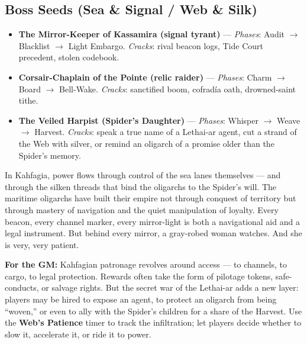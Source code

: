 \subsection*{Boss Seeds (Sea \& Signal / Web \& Silk)}
\begin{itemize}
\item \textbf{The Mirror-Keeper of Kassamira (signal tyrant)} --- \emph{Phases}: Audit $\rightarrow$ Blacklist $\rightarrow$ Light Embargo. \emph{Cracks}: rival beacon logs, Tide Court precedent, stolen codebook.
\item \textbf{Corsair-Chaplain of the Pointe (relic raider)} --- \emph{Phases}: Charm $\rightarrow$ Board $\rightarrow$ Bell-Wake. \emph{Cracks}: sanctified boom, cofradía oath, drowned-saint tithe.
\item \textbf{The Veiled Harpist (Spider's Daughter)} --- \emph{Phases}: Whisper $\rightarrow$ Weave $\rightarrow$ Harvest. \emph{Cracks}: speak a true name of a Lethai-ar agent, cut a strand of the Web with silver, or remind an oligarch of a promise older than the Spider's memory.
\end{itemize}

\begin{tcolorbox}[colback=black!3,colframe=black!40!white,title={Patronage \& Power},breakable]
In Kahfagia, power flows through control of the sea lanes themselves --- and through the silken threads that bind the oligarchs to the Spider's will. The maritime oligarchs have built their empire not through conquest of territory but through mastery of navigation and the quiet manipulation of loyalty. Every beacon, every channel marker, every mirror-light is both a navigational aid and a legal instrument. But behind every mirror, a gray-robed woman watches. And she is very, very patient.

\textbf{For the GM:}  
Kahfagian patronage revolves around access --- to channels, to cargo, to legal protection. Rewards often take the form of pilotage tokens, safe-conducts, or salvage rights. But the secret war of the Lethai-ar adds a new layer: players may be hired to expose an agent, to protect an oligarch from being ``woven,'' or even to ally with the Spider's children for a share of the Harvest. Use the \textbf{Web's Patience} timer to track the infiltration; let players decide whether to slow it, accelerate it, or ride it to power.
\end{tcolorbox}


